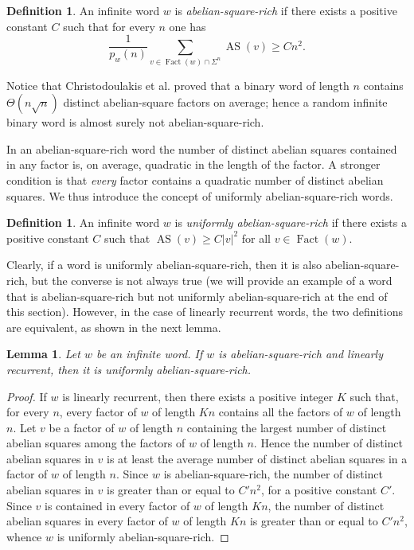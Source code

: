 \documentclass[11pt,reqno]{amsart}
\numberwithin{equation}{section}
\theoremstyle{plain}
\newtheorem{lemma}[theorem]{Lemma}
\theoremstyle{definition}
\newtheorem{definition}[theorem]{Definition}
\theoremstyle{remark}
\DeclareMathOperator{\Fact}{Fact}
\DeclareMathOperator{\AS}{AS}
\newcommand{\as}[1]{\AS(#1)}
\begin{document}
\begin{definition}
An infinite word $w$ is \emph{abelian-square-rich} if there exists a positive constant $C$ such that for every $n$ one has 
\[\frac{1}{p_w(n)}\sum_{v\in \Fact(w)\cap\Sigma^n} \as{v} \geq C n^2.
\]
\end{definition}

Notice that Christodoulakis et al. \cite{Ch14} proved that a binary word of length $n$ contains  $\Theta(n\sqrt{n})$  distinct abelian-square factors on average; 
hence a random infinite binary word is almost surely not  abelian-square-rich.

In an abelian-square-rich word the number of distinct abelian squares contained in any factor is, on average, quadratic in the length of the factor. A stronger condition is that \emph{every} factor contains a quadratic number of distinct abelian squares. We thus 
introduce the concept of uniformly abelian-square-rich words.

\begin{definition}
An infinite word $w$ is {\it uniformly abelian-square-rich\/} if 
there exists a positive constant $C$ such that $\as{v} \geq C |v|^2$
for all $v \in \Fact(w)$.
\end{definition}

Clearly, if a word is uniformly abelian-square-rich, then it is also abelian-square-rich, but the converse is not always true (we will provide an example of a  word that is abelian-square-rich but not uniformly abelian-square-rich at the end of this section). However, in the case of linearly recurrent words, the two definitions are equivalent, as shown in the next lemma.

\begin{lemma}\label{lem:un}
Let $w$ be an infinite word. If $w$ is abelian-square-rich and linearly recurrent, then it is uniformly abelian-square-rich.
\end{lemma}

\begin{proof}
If $w$ is linearly recurrent, then there exists a positive integer $K$ such that, for every $n$, every factor of $w$ of length $Kn$ contains all the factors of $w$ of length $n$. Let $v$ be a factor of $w$ of length $n$ containing the largest number of distinct abelian squares among the factors of $w$ of length $n$. Hence the number of distinct abelian squares in $v$ is at least the average number of distinct abelian squares in a factor of $w$ of length $n$. Since $w$ is abelian-square-rich, the number of distinct abelian squares in $v$ is greater than or equal to $C'n^2$, for a positive constant $C'$. Since $v$ is contained in every factor of $w$ of length $Kn$, the number of distinct abelian squares in every factor of $w$ of length $Kn$ is greater than or equal to $C'n^2$, whence $w$ is uniformly abelian-square-rich.
\end{proof}
\end{document}
